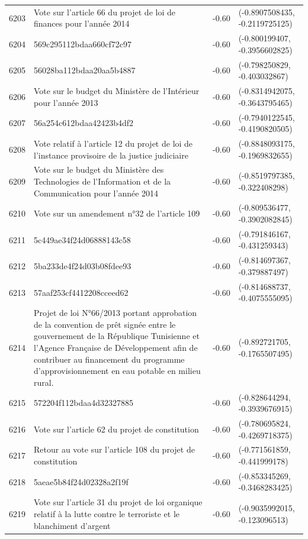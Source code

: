 \begin{table}[ht]
\begin{tabular}{rlrl}
  6203 & Vote sur l'article 66 du projet de loi de finances pour l'année 2014 & -0.60 & (-0.8907508435, -0.2119725125) \\ 
  6204 & 569c295112bdaa660cf72c97 & -0.60 & (-0.800199407, -0.3956602825) \\ 
  6205 & 56028ba112bdaa20aa5b4887 & -0.60 & (-0.798250829, -0.403032867) \\ 
  6206 & Vote sur le budget du Ministère de l'Intérieur pour l'année 2013 & -0.60 & (-0.8314942075, -0.3643795465) \\ 
  6207 & 56a254c612bdaa42423b4df2 & -0.60 & (-0.7940122545, -0.4190820505) \\ 
  6208 & Vote relatif à l'article 12 du projet de loi de l'instance provisoire de la justice judiciaire & -0.60 & (-0.8848093175, -0.1969832655) \\ 
  6209 & Vote sur le budget du Ministère des Technologies de l'Information et de la Communication pour l'année 2014 & -0.60 & (-0.8519797385, -0.322408298) \\ 
  6210 & Vote sur un amendement n°32 de l'article 109 & -0.60 & (-0.809536477, -0.3902082845) \\ 
  6211 & 5c449ae34f24d06888143c58 & -0.60 & (-0.791846167, -0.431259343) \\ 
  6212 & 5ba233de4f24d03b08fdee93 & -0.60 & (-0.814697367, -0.379887497) \\ 
  6213 & 57aaf253cf4412208cceed62 & -0.60 & (-0.814688737, -0.4075555095) \\ 
  6214 & Projet de loi N°66/2013 portant approbation de la convention de prêt signée entre le gouvernement de la République Tunisienne et l'Agence Française de Développement afin de contribuer au financement du programme d'approvisionnement en eau potable en milieu rural. & -0.60 & (-0.892721705, -0.1765507495) \\ 
  6215 & 572204f112bdaa4d32327885 & -0.60 & (-0.828644294, -0.3939676915) \\ 
  6216 & Vote sur l'article 62 du projet de constitution & -0.60 & (-0.780695824, -0.4269718375) \\ 
  6217 & Retour au vote sur l'article 108 du projet de constitution & -0.60 & (-0.771561859, -0.441999178) \\ 
  6218 & 5aeae5b84f24d02328a2f19f & -0.60 & (-0.853345269, -0.3468283425) \\ 
  6219 & Vote sur l'article 31 du projet de loi organique relatif à la lutte contre le terroriste et le blanchiment d'argent & -0.60 & (-0.9035992015, -0.123096513) \\ 

\end{tabular}
\end{table}
